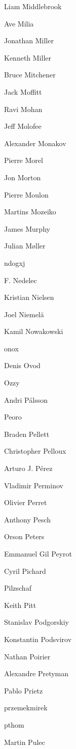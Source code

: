 \begin{DoxyItemize}
\item Liam Middlebrook
\item Ave Milia
\item Jonathan Miller
\item Kenneth Miller
\item Bruce Mitchener
\item Jack Moffitt
\item Ravi Mohan
\item Jeff Molofee
\item Alexander Monakov
\item Pierre Morel
\item Jon Morton
\item Pierre Moulon
\item Martins Mozeiko
\item James Murphy
\item Julian Møller
\item ndogxj
\item F. Nedelec
\item Kristian Nielsen
\item Joel Niemelä
\item Kamil Nowakowski
\item onox
\item Denis Ovod
\item Ozzy
\item Andri Pálsson
\item Peoro
\item Braden Pellett
\item Christopher Pelloux
\item Arturo J. Pérez
\item Vladimir Perminov
\item Olivier Perret
\item Anthony Pesch
\item Orson Peters
\item Emmanuel Gil Peyrot
\item Cyril Pichard
\item Pilzschaf
\item Keith Pitt
\item Stanislav Podgorskiy
\item Konstantin Podsvirov
\item Nathan Poirier
\item Alexandre Pretyman
\item Pablo Prietz
\item przemekmirek
\item pthom
\item Martin Pulec

\end{DoxyItemize}
